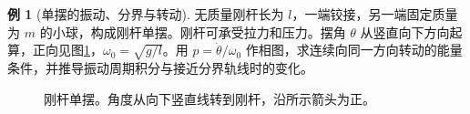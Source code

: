 \documentclass[11pt,openany,fontset=fandol]{ctexbook}
\theoremstyle{definition}\newtheorem{example}{例}[chapter]\newtheorem{exercise}{习题}[chapter]
\begin{document}
\par\medskip\noindent\begin{minipage}{\textwidth}
\begin{example}[单摆的振动、分界与转动]\label{mp4:example:l4-e6}
无质量刚杆长为 $l$，一端铰接，另一端固定质量为 $m$ 的小球，构成刚杆单摆。刚杆可承受拉力和压力。摆角 $\theta$ 从竖直向下方向起算，正向见图\ref{mp4:fig:l4-e6-q}，$\omega_0=\sqrt{g/l}$。用 $p=\dot\theta/\omega_0$ 作相图，求连续向同一方向转动的能量条件，并推导振动周期积分与接近分界轨线时的变化。
\end{example}

\begin{figure}[H]\centering
{}
\caption{刚杆单摆。角度从向下竖直线转到刚杆，沿所示箭头为正。}\label{mp4:fig:l4-e6-q}
\end{figure}
\end{minipage}\par\medskip
\end{document}
